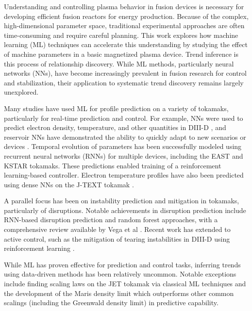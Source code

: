 
Understanding and controlling plasma behavior in fusion devices is necessary for developing efficient fusion reactors for energy production. Because of the complex, high-dimensional parameter space, traditional experimental approaches are often time-consuming and require careful planning. This work explores how machine learning (ML) techniques can accelerate this understanding by studying the effect of machine parameters in a basic magnetized plasma device. Trend inference is this process of relationship discovery. While ML methods, particularly neural networks (NNs), have become increasingly prevalent in fusion research for control and stabilization, their application to systematic trend discovery remains largely unexplored.

Many studies have used ML for profile prediction on a variety of tokamaks, particularly for real-time prediction and control. For example, NNs were used to predict electron density, temperature, and other quantities in DIII-D \cite{abbate_data-driven_2021}, and reservoir NNs have demonstrated the ability to quickly adapt to new scenarios or devices \cite{jalalvand_real-time_2022}. Temporal evolution of parameters has been successfully modeled using recurrent neural networks (RNNs)\cite{char_full_2024} for multiple devices, including the EAST\cite{wan_east_2022} and KSTAR tokamaks\cite{seo_feedforward_2021,seo_development_2022}. These predictions enabled training of a reinforcement learning-based controller\cite{seo_feedforward_2021,seo_development_2022}. Electron temperature profiles have also been predicted using dense NNs on the J-TEXT tokamak \cite{dong_machine_2021}.

A parallel focus has been on instability prediction and mitigation in tokamaks, particularly of disruptions. Notable achievements in disruption prediction include RNN-based disruption prediction \cite{kates-harbeck_predicting_2019} and random forest approaches\cite{rea_real-time_2019}, with a comprehensive review available by Vega et al \cite{vega_disruption_2022}. Recent work has extended to active control, such as the mitigation of tearing instabilities in DIII-D using reinforcement learning \cite{seo_avoiding_2024}. 

While ML has proven effective for prediction and control tasks, inferring trends using data-driven methods has been relatively uncommon. Notable exceptions include finding scaling laws on the JET tokamak\cite{murari_investigating_2020} via classical ML techniques and the development of the Maris density limit\cite{maris_correlation_2024} which outperforms other common scalings (including the Greenwald density limit) in predictive capability.

